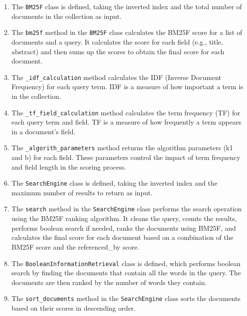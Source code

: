 \documentclass{article}
\begin{document}
\begin{enumerate}
    \item The \texttt{BM25F} class is defined, taking the inverted index and the total number of 
    documents in the collection as input.
    \item The \texttt{bm25f} method in the \texttt{BM25F} class calculates the BM25F score for a 
    list of documents and a query. It calculates the score for each field (e.g., title, 
    abstract) and then sums up the scores to obtain the final score for each document.
    \item The \texttt{\_idf\_calculation} method calculates the IDF (Inverse Document Frequency) 
    for each query term. IDF is a measure of how important a term is in the collection.
    \item The \texttt{\_tf\_field\_calculation} method calculates the term frequency (TF) for 
    each query term and field. TF is a measure of how frequently a term appears in a document's 
    field.
    \item The \texttt{\_algorith\_parameters} method returns the algorithm parameters (k1 and b) 
    for each field. These parameters control the impact of term frequency and field length in 
    the scoring process.
    \item The \texttt{SearchEngine} class is defined, taking the inverted index and the maximum 
    number of results to return as input.
    \item The \texttt{search} method in the \texttt{SearchEngine} class performs the search 
    operation using the BM25F ranking algorithm. It cleans the query, counts the results, 
    performs boolean search if needed, ranks the documents using BM25F, and calculates the final 
    score for each document based on a combination of the BM25F score and the referenced\_by 
    score.
    \item The \texttt{BooleanInformationRetrieval} class is defined, which performs boolean 
    search by finding the documents that contain all the words in the query. The documents are 
    then ranked by the number of words they contain.
    \item The \texttt{sort\_documents} method in the \texttt{SearchEngine} class sorts the 
    documents based on their scores in descending order.
\end{enumerate}
\end{document}
